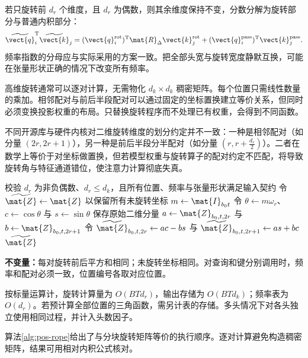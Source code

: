 \documentclass[../textbook.tex]{subfiles}
\begin{document}
若只旋转前 $d_r$ 个维度，且 $d_r$ 为偶数，则其余维度保持不变，分数分解为旋转部分与普通内积部分：
\begin{equation}
 \widetilde{\vect{q}}_i^{\mathrm{T}}\widetilde{\vect{k}}_j
 =(\vect{q}_i^{\mathrm{rot}})^{\mathrm{T}}\mat{R}_\Delta \vect{k}_j^{\mathrm{rot}}
 +(\vect{q}_i^{\mathrm{pass}})^{\mathrm{T}}\vect{k}_j^{\mathrm{pass}}.
\end{equation}
频率指数的分母应与实际采用的方案一致。把全部头宽与旋转宽度静默互换，可能在张量形状正确的情况下改变所有频率。

高维旋转通常可以逐对计算，无需物化 $d_k\times d_k$ 稠密矩阵。每个位置只需线性数量的乘加。相邻配对与前后半段配对可以通过固定的坐标置换建立等价关系，但同时必须变换投影权重的布局。只替换旋转程序而不处理已有权重，会得到不同函数。

\begin{warning}
不同开源库与硬件内核对二维旋转维度的划分约定并不一致：一种是相邻配对（如分量 $(2r, 2r+1)$），另一种是前后半段分半配对（如分量 $(r, r+\frac{d_r}{2})$）。二者在数学上等价于对坐标做置换，但若模型权重与旋转算子的配对约定不匹配，将导致旋转角与特征通道错位，使注意力计算彻底失真。
\end{warning}

\begin{algorithm}\label{alg:pos-rope}
\begin{myalgorithmic}[1]
\State 校验 $d_r$ 为非负偶数、$d_r\le d_k$，且所有位置、频率与张量形状满足输入契约
\State 令 $\widetilde{\mat{Z}}\gets \mat{Z}$ 以保留所有未旋转坐标
  \State $m\gets \mat{I}_{b_0t}$
    \State 令 $\theta\gets m\omega_r$、$c\gets\cos\theta$ 与 $s\gets\sin\theta$
    \State 保存原始二维分量 $a\gets \mat{Z}_{b_0,t,2r}$ 与 $b\gets \mat{Z}_{b_0,t,2r+1}$
    \State 令 $\widetilde{\mat{Z}}_{b_0,t,2r}\gets ac-bs$ 与 $\widetilde{\mat{Z}}_{b_0,t,2r+1}\gets as+bc$
  \EndFor
\EndFor
\State \Return $\widetilde{\mat{Z}}$
\end{myalgorithmic}
\textbf{不变量：}每对旋转前后平方和相同；未旋转坐标相同。对查询和键分别调用时，频率和配对必须一致，位置编号各取对应位置。

按标量运算计，旋转计算量为 $O(BTd_r)$，输出存储为 $O(BTd_k)$；频率表为 $O(d_r)$。若预计算全部位置的三角函数，需另计表的存储。多头情况下对各头独立使用相同过程，并计入头数因子。
\end{algorithm}
算法\ref{alg:pos-rope}给出了与分块旋转矩阵等价的执行顺序。逐对计算避免构造稠密矩阵，结果可用相对内积公式核对。
\end{document}
